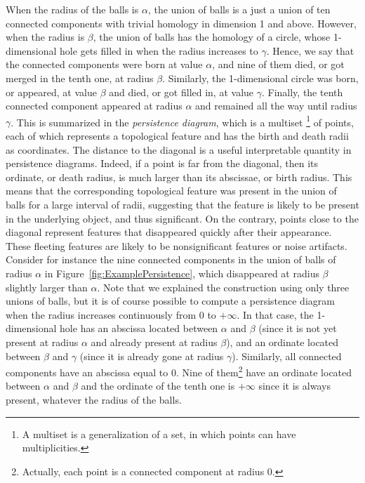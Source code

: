 When the radius of the balls is $\alpha$,
the union of balls is a just a union of ten connected components with trivial homology in dimension 1 and above.
However, when the radius is $\beta$, the union of balls has the homology of a circle, whose 1-dimensional hole
gets filled in when the radius increases to $\gamma$. Hence, we say that the connected components were born at value $\alpha$,
and nine of them died, or got merged in the tenth one, at radius $\beta$. Similarly, the 1-dimensional circle was born, or appeared, at value $\beta$ and
died, or got filled in, at value $\gamma$. Finally, the tenth connected component appeared at radius $\alpha$ and remained all the way until radius $\gamma$.
This is summarized in the {\em persistence diagram}, which is a multiset
\footnote{A multiset is a generalization of a set, in which points can have multiplicities.}
of points, each of which 
represents a topological feature and has the birth and death radii as coordinates. 
The distance to the diagonal is a useful interpretable quantity in persistence diagrams. Indeed, if a point is far from the diagonal, then 
its ordinate, or death radius, is much larger than its abscissae, or birth radius. This means that the corresponding topological feature was
present in the union of balls for a large interval of radii, suggesting that the feature is likely to be present in the underlying object, and thus significant.
On the contrary, points close to the diagonal represent features that disappeared quickly after their appearance. These fleeting features are 
likely to be nonsignificant features or noise artifacts. Consider for instance the nine connected components in the union of balls of 
radius $\alpha$ in Figure~\ref{fig:ExamplePersistence}, which disappeared at radius $\beta$ slightly larger than $\alpha$.
Note that we explained the construction using only three unions of balls, but it is of course possible to compute
a persistence diagram when the radius increases continuously from $0$ to $+\infty$. 
In that case, 
the 1-dimensional hole has an abscissa located between $\alpha$ and $\beta$ (since it is not yet present at radius $\alpha$
and already present at radius $\beta$), and an ordinate located between $\beta$ and $\gamma$ (since it is already gone at radius $\gamma$).
Similarly, all connected components have an abscissa equal to $0$. Nine of them\footnote{Actually, each point is a connected component at radius $0$.} 
have an ordinate located  between $\alpha$ and $\beta$
and the ordinate of the tenth one is $+\infty$ since it is always present, whatever the radius of the balls.


